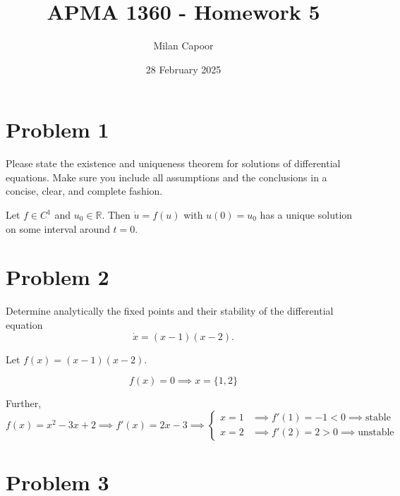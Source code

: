 \documentclass[12pt]{article}
\title{APMA 1360 - Homework 5}
\author{Milan Capoor}
\date{28 February 2025}
\newcommand{\R}{\mathbb{R}}
\begin{document}
\maketitle

\section*{Problem 1}

Please state the existence and uniqueness theorem for solutions of differential equations. Make sure you include all assumptions and the conclusions in a concise, clear, and complete fashion.

\color{blue}
Let $f \in C^1$ and $u_0 \in \R$. Then $\dot u = f(u)$ with $u(0) = u_0$ has a unique solution on some interval around $t = 0$.
\color{black}


\pagebreak
\section*{Problem 2}

Determine analytically the fixed points and their stability of the differential equation
\[
    \dot{x} = (x-1)(x-2).
\]

\color{blue}
Let $f(x) = (x-1)(x-2)$.

\[f(x) = 0 \implies x = \{1, 2\}\]

Further,
\[f(x) = x^2 -3x + 2 \implies f'(x) = 2x -3 \implies \begin{cases}
        x = 1 & \implies f'(1) = -1< 0 \implies \text{stable}   \\
        x = 2 & \implies f'(2) = 2 > 0 \implies \text{unstable}
    \end{cases}\]
\color{black}



\pagebreak
\section*{Problem 3}
\end{document}
